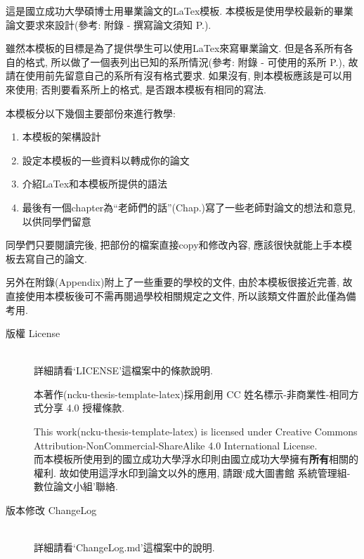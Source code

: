 
這是國立成功大學碩博士用畢業論文的LaTex模板. 本模板是使用學校最新的畢業論文要求來設計(參考: 附錄 - 撰寫論文須知 P.).

雖然本模板的目標是為了提供學生可以使用LaTex來寫畢業論文. 但是各系所有各自的格式, 所以做了一個表列出已知的系所情況(參考: 附錄 - 可使用的系所 P.), 故請在使用前先留意自己的系所有沒有格式要求. 如果沒有, 則本模板應該是可以用來使用; 否則要看系所上的格式, 是否跟本模板有相同的寫法.

本模板分以下幾個主要部份來進行教學:

\begin{enumerate}
  \item 本模板的架構設計
  \item 設定本模板的一些資料以轉成你的論文
  \item 介紹LaTex和本模板所提供的語法
  \item 最後有一個chapter為``老師們的話''(Chap.)寫了一些老師對論文的想法和意見, 以供同學們留意
\end{enumerate}

同學們只要閱讀完後, 把部份的檔案直接copy和修改內容, 應該很快就能上手本模板去寫自己的論文.

另外在附錄(Appendix)附上了一些重要的學校的文件, 由於本模板很接近完善, 故直接使用本模板後可不需再閱過學校相關規定之文件, 所以該類文件置於此僅為備考用.

\newpage

\begin{description}
  \item[版權 License]\hfill\\
  詳細請看`LICENSE'這檔案中的條款說明.\\


    本著作(ncku-thesis-template-latex)採用創用 CC 姓名標示-非商業性-相同方式分享 4.0 授權條款.

    This work(ncku-thesis-template-latex) is licensed under Creative Commons Attribution-NonCommercial-ShareAlike 4.0 International License.\\

  而本模板所使用到的國立成功大學浮水印則由國立成功大學擁有\textbf{所有}相關的權利. 故如使用這浮水印到論文以外的應用, 請跟`成大圖書館 系統管理組-數位論文小組'聯絡.\\

  \item[版本修改 ChangeLog]\hfill\\
  詳細請看`ChangeLog.md'這檔案中的說明.
\end{description}

\EndChapter
